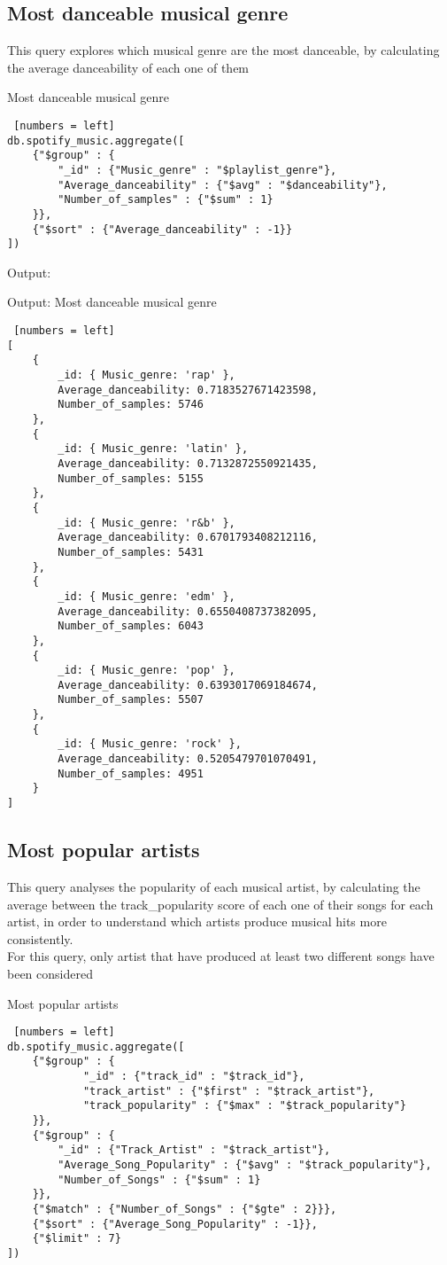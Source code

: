 \documentclass{Configuration_Files/PoliMi3i_thesis}
\begin{document}
\subsection{Most danceable musical genre}
This query explores which musical genre are the most danceable, by calculating the average danceability of each one of them\\
\begin{algorithm}[ht]
\caption{Most danceable musical genre}
\begin{lstlisting} [numbers = left]
db.spotify_music.aggregate([
	{"$group" : {
		"_id" : {"Music_genre" : "$playlist_genre"},
		"Average_danceability" : {"$avg" : "$danceability"},
		"Number_of_samples" : {"$sum" : 1}
	}},
  	{"$sort" : {"Average_danceability" : -1}}
])
\end{lstlisting}
\end{algorithm}
\newpage

Output:
\begin{algorithm}[ht]
\caption{Output: Most danceable musical genre}
\begin{lstlisting} [numbers = left]
[
	{
		_id: { Music_genre: 'rap' },
		Average_danceability: 0.7183527671423598,
		Number_of_samples: 5746
	},
	{
		_id: { Music_genre: 'latin' },
		Average_danceability: 0.7132872550921435,
		Number_of_samples: 5155
	},
	{
		_id: { Music_genre: 'r&b' },
		Average_danceability: 0.6701793408212116,
		Number_of_samples: 5431
	},
	{
		_id: { Music_genre: 'edm' },
		Average_danceability: 0.6550408737382095,
		Number_of_samples: 6043
	},
	{
		_id: { Music_genre: 'pop' },
		Average_danceability: 0.6393017069184674,
		Number_of_samples: 5507
	},
	{
		_id: { Music_genre: 'rock' },
		Average_danceability: 0.5205479701070491,
		Number_of_samples: 4951
	}
]
\end{lstlisting}
\end{algorithm}
\newpage
\subsection{Most popular artists}
This query analyses the popularity of each musical artist, by calculating the average between the track\_popularity score of each one of their songs for each artist, in order to understand which artists produce musical hits more consistently.\\
For this query, only artist that have produced at least two different songs have been considered
\begin{algorithm}[ht]
\caption{Most popular artists}
\begin{lstlisting} [numbers = left]
db.spotify_music.aggregate([
	{"$group" : {
			"_id" : {"track_id" : "$track_id"},
			"track_artist" : {"$first" : "$track_artist"}, 
			"track_popularity" : {"$max" : "$track_popularity"}
	}},
	{"$group" : {
		"_id" : {"Track_Artist" : "$track_artist"},
		"Average_Song_Popularity" : {"$avg" : "$track_popularity"},
		"Number_of_Songs" : {"$sum" : 1}
	}},
	{"$match" : {"Number_of_Songs" : {"$gte" : 2}}},
	{"$sort" : {"Average_Song_Popularity" : -1}},
	{"$limit" : 7}
])
\end{lstlisting}
\end{algorithm}
\newpage
\end{document}
